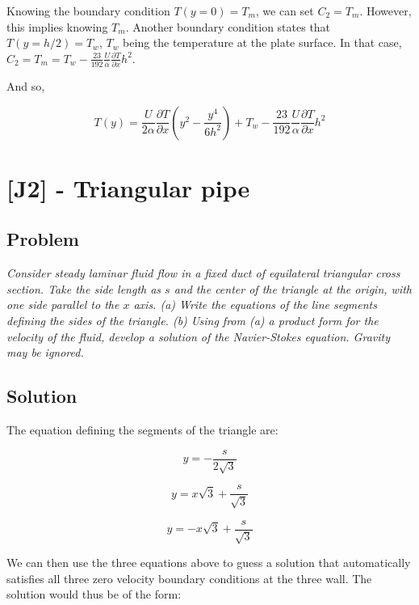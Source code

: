 Knowing the boundary condition $T(y = 0) = T_m$, we can set $C_2 = T_m$. However, this implies knowing $T_m$. Another boundary condition states that $T(y = h/2) = T_w$, $T_w$ being the temperature at the plate surface. In that case, $C_2 = T_m = T_w - \frac{23}{192}\frac{U}{\alpha}\frac{\partial T}{\partial x} h^2$.

And so,


\begin{equation}
T(y) = \frac{U}{2\alpha} \frac{\partial T}{\partial x} \left( y^2 - \frac{y^4}{6h^2} \right) + T_w - \frac{23}{192}\frac{U}{\alpha}\frac{\partial T}{\partial x} h^2
\end{equation}


\section{[J2] - Triangular pipe}
\label{prob94}


\subsection{Problem}
\textit{Consider steady laminar fluid flow in a fixed duct of equilateral triangular cross section. Take the side length as $s$ and the center of the triangle at the origin, with one side parallel to the $x$ axis. (a) Write the equations of the line segments defining the sides of the triangle. (b) Using from (a) a product form for the velocity of the fluid, develop a solution of the Navier-Stokes equation. Gravity may be ignored.}

\subsection{Solution}

The equation defining the segments of the triangle are:


\begin{equation}
y = -\frac{s}{2\sqrt{3}}
\end{equation}

\begin{equation}
y = x\sqrt{3} + \frac{s}{\sqrt{3}}
\end{equation}

\begin{equation}
y = -x\sqrt{3} + \frac{s}{\sqrt{3}}
\end{equation}

We can then use the three equations above to guess a solution that automatically satisfies all three zero velocity boundary conditions at the three wall. The solution would thus be of the form:

